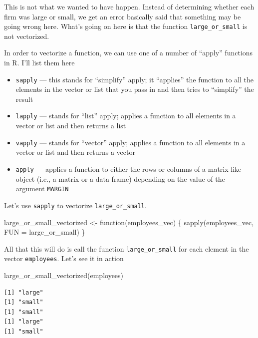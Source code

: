\documentclass[
  letterpaper,
  DIV=11,
  numbers=noendperiod]{scrreprt}
\newenvironment{Shaded}{\begin{snugshade}}{\end{snugshade}}
\newcommand{\AttributeTok}[1]{\textcolor[rgb]{0.40,0.45,0.13}{#1}}
\newcommand{\ControlFlowTok}[1]{\textcolor[rgb]{0.00,0.23,0.31}{#1}}
\newcommand{\FunctionTok}[1]{\textcolor[rgb]{0.28,0.35,0.67}{#1}}
\newcommand{\NormalTok}[1]{\textcolor[rgb]{0.00,0.23,0.31}{#1}}
\newcommand{\OtherTok}[1]{\textcolor[rgb]{0.00,0.23,0.31}{#1}}
\begin{document}
This is not what we wanted to have happen. Instead of determining
whether each firm was large or small, we get an error basically said
that something may be going wrong here. What's going on here is that the
function \texttt{large\_or\_small} is not vectorized.

In order to vectorize a function, we can use one of a number of
``apply'' functions in R. I'll list them here

\begin{itemize}
\item
  \texttt{sapply} --- this stands for ``simplify'' apply; it ``applies''
  the function to all the elements in the vector or list that you pass
  in and then tries to ``simplify'' the result
\item
  \texttt{lapply} --- stands for ``list'' apply; applies a function to
  all elements in a vector or list and then returns a list
\item
  \texttt{vapply} --- stands for ``vector'' apply; applies a function to
  all elements in a vector or list and then returns a vector
\item
  \texttt{apply} --- applies a function to either the rows or columns of
  a matrix-like object (i.e., a matrix or a data frame) depending on the
  value of the argument \texttt{MARGIN}
\end{itemize}

Let's use \texttt{sapply} to vectorize \texttt{large\_or\_small}.

\begin{Shaded}
\begin{Highlighting}[]
\NormalTok{large\_or\_small\_vectorized }\OtherTok{\textless{}{-}} \ControlFlowTok{function}\NormalTok{(employees\_vec) \{}
  \FunctionTok{sapply}\NormalTok{(employees\_vec, }\AttributeTok{FUN =}\NormalTok{ large\_or\_small)}
\NormalTok{\}}
\end{Highlighting}
\end{Shaded}

All that this will do is call the function \texttt{large\_or\_small} for
each element in the vector \texttt{employees}. Let's see it in action

\begin{Shaded}
\begin{Highlighting}[]
\FunctionTok{large\_or\_small\_vectorized}\NormalTok{(employees)}
\end{Highlighting}
\end{Shaded}

\begin{verbatim}
[1] "large"
[1] "small"
[1] "small"
[1] "large"
[1] "small"
\end{verbatim}
\end{document}
